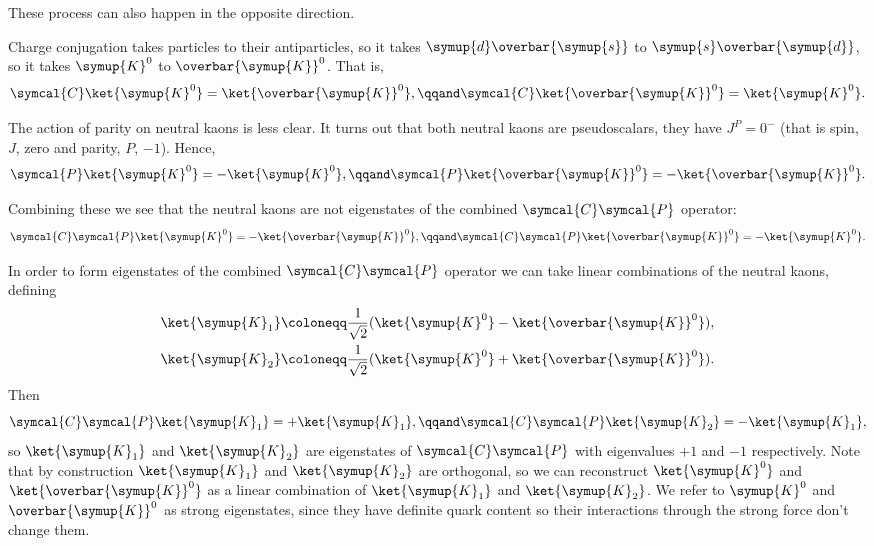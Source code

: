 \documentclass[fleqn]{NotesClass}
\newcommand{\Pparticle}[1]{\symup{#1}}
\newcommand{\Pd}{\ensuremath{\Pparticle{d}}}
\newcommand{\Ps}{\ensuremath{\Pparticle{s}}}
\newcommand{\PKzero}{\ensuremath{\Pparticle{K}^0}}
\newcommand{\PK}{\ensuremath{\Pparticle{K}}}
\newcommand{\APantiparticle}[1]{\overbar{#1}}
\newcommand{\APd}{\ensuremath{\APantiparticle{\Pparticle{d}}}}
\newcommand{\APs}{\ensuremath{\APantiparticle{\Pparticle{s}}}}
\newcommand{\APKzero}{\ensuremath{\APantiparticle{\Pparticle{K}}^0}}
\newcommand{\parity}{\symcal{P}}
\newcommand{\chargeConjugation}{\symcal{C}}
\begin{document}
    These process can also happen in the opposite direction.
    
    Charge conjugation takes particles to their antiparticles, so it takes \(\Pd\APs\) to \(\Ps\APd\), so it takes \(\PKzero\) to \(\APKzero\).
    That is,
    \begin{equation}
        \chargeConjugation \ket{\PKzero} = \ket{\APKzero}, \qqand \chargeConjugation \ket{\APKzero} = \ket{\PKzero}.
    \end{equation}

    The action of parity on neutral kaons is less clear.
    It turns out that both neutral kaons are pseudoscalars, they have \(J^P = 0^-\) (that is spin, \(J\), zero and parity, \(P\), \(-1\)).
    Hence,
    \begin{equation}
        \parity \ket{\PKzero} = -\ket{\PKzero}, \qqand \parity \ket{\APKzero} = -\ket{\APKzero}.
    \end{equation}
    
    Combining these we see that the neutral kaons are not eigenstates of the combined \(\chargeConjugation\parity\) operator:
    \begin{equation}
        \chargeConjugation\parity \ket{\PKzero} = -\ket{\APKzero}, \qqand \chargeConjugation\parity \ket{\APKzero} = -\ket{\PKzero}.
    \end{equation}
    
    In order to form eigenstates of the combined \(\chargeConjugation\parity\) operator we can take linear combinations of the neutral kaons, defining
    \begin{align}
        \ket{\PK_1} &\coloneqq \frac{1}{\sqrt{2}} (\ket{\PKzero} - \ket{\APKzero}),\\
        \ket{\PK_2} &\coloneqq \frac{1}{\sqrt{2}} (\ket{\PKzero} + \ket{\APKzero}).
    \end{align}
    Then
    \begin{equation}
        \chargeConjugation\parity\ket{\PK_1} = +\ket{\PK_1}, \qqand \chargeConjugation\parity\ket{\PK_2} = -\ket{\PK_1},
    \end{equation}
    so \(\ket{\PK_1}\) and \(\ket{\PK_2}\) are eigenstates of \(\chargeConjugation\parity\) with eigenvalues \(+1\) and \(-1\) respectively.
    Note that by construction \(\ket{\PK_1}\) and \(\ket{\PK_2}\) are orthogonal, so we can reconstruct \(\ket{\PKzero}\) and \(\ket{\APKzero}\) as a linear combination of \(\ket{\PK_1}\) and \(\ket{\PK_2}\).
    We refer to \(\PKzero\) and \(\APKzero\) as strong eigenstates, since they have definite quark content so their interactions through the strong force don't change them.
    
\end{document}
